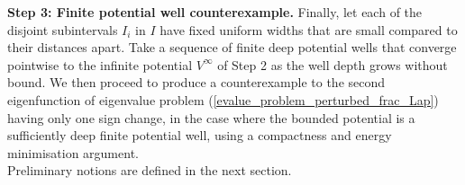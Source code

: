 \documentclass[preprint,12pt]{elsarticle}
\begin{document}
\textbf{Step 3: Finite potential well counterexample.} 
Finally, let each of the disjoint subintervals $I_i$ in $I$ have fixed uniform widths that are small compared to their distances apart. Take a sequence of finite deep potential wells that converge pointwise to the infinite potential $V^\infty$ of Step 2 as the well depth grows without bound.
We then proceed to produce a counterexample to the second eigenfunction of eigenvalue problem (\ref{evalue_problem_perturbed_frac_Lap}) having only one sign change, in the case where the bounded potential is a sufficiently deep finite potential well, using a compactness and energy minimisation argument.\\

Preliminary notions are defined in the next section. 

%
\end{document}
